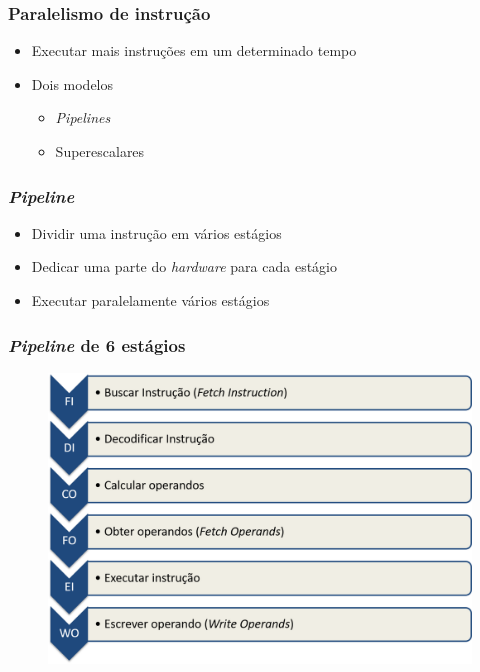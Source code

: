 \documentclass[aspectratio=169,
				xcolor=table]{beamer}
\begin{document}
	\begin{frame}
		\frametitle{Paralelismo de instrução}
		\begin{itemize}
			\item Executar mais instruções em um determinado tempo
			\vspace{1em}
			\item Dois modelos
			\begin{itemize}
				\item \textit{Pipelines}
				\item Superescalares
			\end{itemize}

		\end{itemize}
	\end{frame}
	
	\begin{frame}
		\frametitle{\textit{Pipeline}}
		\begin{itemize}
			\item Dividir uma instrução em vários estágios

			\item Dedicar uma parte do \textit{hardware} para cada estágio

			\item Executar paralelamente vários estágios 

		\end{itemize}
	\end{frame}

	\begin{frame}
		\frametitle{\textit{Pipeline} de 6 estágios}
		\begin{figure}
			\centering
			\includegraphics[height=0.8\textheight , keepaspectratio]{../figs/cap05/pipeline01.png} 
		\end{figure}
	\end{frame}
	
\end{document}
